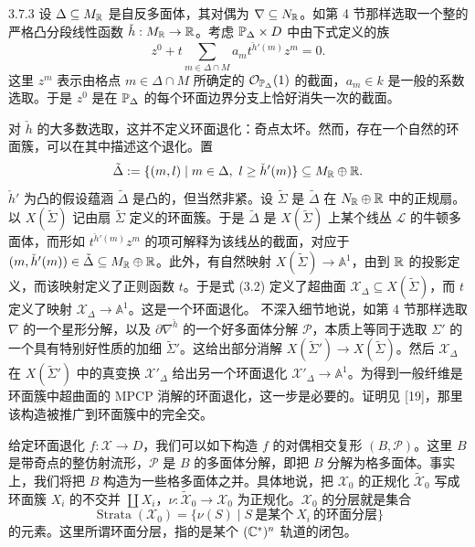 \begin{example}{3.7.3}
设 $\Delta\subseteq M_{\mathbb{R}}$ 是自反多面体，其对偶为 $\nabla\subseteq N_{\mathbb{R}}$。如第 4 节那样选取一个整的严格凸分段线性函数 $\check h:M_{\mathbb{R}}\to\mathbb{R}$。考虑 $\mathbb{P}_\Delta\times D$ 中由下式定义的族
\begin{equation}
z^0+t\sum_{m\in\Delta\cap M}a_mt^{\check h'(m)}z^m=0. \tag{3.2}
\end{equation}
这里 $z^m$ 表示由格点 $m\in\Delta\cap M$ 所确定的 $\mathcal O_{\mathbb{P}_\Delta}(1)$ 的截面，$a_m\in k$ 是一般的系数选取。于是 $z^0$ 是在 $\mathbb{P}_\Delta$ 的每个环面边界分支上恰好消失一次的截面。

对 $\check h$ 的大多数选取，这并不定义环面退化：奇点太坏。然而，存在一个自然的环面簇，可以在其中描述这个退化。置
\[
\tilde\Delta:=\{(m,l)\mid m\in\Delta,\ l\ge\check h'(m)\}\subseteq M_\R\oplus\R.
\]
$\check h'$ 为凸的假设蕴涵 $\tilde\Delta$ 是凸的，但当然非紧。设 $\tilde\Sigma$ 是 $\tilde\Delta$ 在 $N_{\mathbb{R}}\oplus\mathbb{R}$ 中的正规扇。以 $X(\tilde\Sigma)$ 记由扇 $\tilde\Sigma$ 定义的环面簇。于是 $\tilde\Delta$ 是 $X(\tilde\Sigma)$ 上某个线丛 $\mathcal L$ 的牛顿多面体，而形如 $t^{\check h'(m)}z^m$ 的项可解释为该线丛的截面，对应于 $(m,\check h'(m))\in\tilde\Delta\subseteq M_{\mathbb{R}}\oplus\mathbb{R}$。此外，有自然映射 $X(\tilde\Sigma)\to\mathbb A^1$，由到 $\mathbb{R}$ 的投影定义，而该映射定义了正则函数 $t$。于是式 (3.2) 定义了超曲面 $\mathcal X_\Delta\subseteq X(\tilde\Sigma)$，而 $t$ 定义了映射 $\mathcal X_\Delta\to\mathbb A^1$。这是一个环面退化。
不深入细节地说，如第 4 节那样选取 $\nabla$ 的一个星形分解，以及 $\partial\nabla^{\check h}$ 的一个好多面体分解 $\mathcal P$，本质上等同于选取 $\Sigma'$ 的一个具有特别好性质的加细 $\tilde\Sigma'$。这给出部分消解 $X(\tilde\Sigma')\to X(\tilde\Sigma)$。然后 $\mathcal X_\Delta$ 在 $X(\tilde\Sigma')$ 中的真变换 $\mathcal X'_\Delta$ 给出另一个环面退化 $\mathcal X'_\Delta\to\mathbb A^1$。为得到一般纤维是环面簇中超曲面的 MPCP 消解的环面退化，这一步是必要的。证明见 [19]，那里该构造被推广到环面簇中的完全交。\proofend
\end{example}

给定环面退化 $f:\mathcal X\to D$，我们可以如下构造 $f$ 的对偶相交复形 $(B,\mathcal P)$。这里 $B$ 是带奇点的整仿射流形，$\mathcal P$ 是 $B$ 的多面体分解，即把 $B$ 分解为格多面体。事实上，我们将把 $B$ 构造为一些格多面体之并。具体地说，把 $\mathcal X_0$ 的正规化 $\tilde{\mathcal X}_0$ 写成环面簇 $X_i$ 的不交并 $\coprod X_i$，$\nu:\tilde{\mathcal X}_0\to\mathcal X_0$ 为正规化。$\mathcal X_0$ 的分层就是集合
\[
\operatorname{Strata}(\mathcal X_0)=\{\nu(S)\mid S\ \text{是某个}\ X_i\ \text{的环面分层}\}
\]
的元素。这里所谓环面分层，指的是某个 $(\mathbb{C}^*)^n$ 轨道的闭包。

